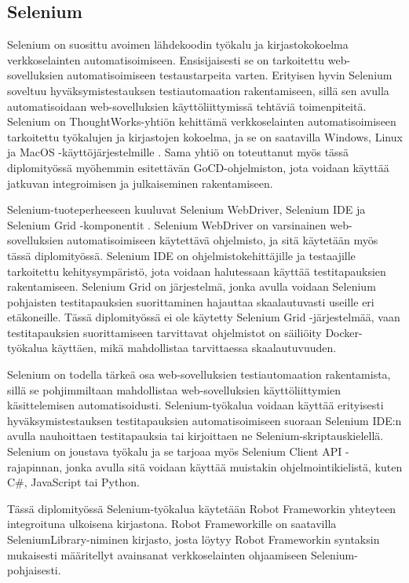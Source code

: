   \subsection{Selenium} \label{ch:08_selenium}

    Selenium on suosittu avoimen lähdekoodin työkalu ja kirjastokokoelma verkkoselainten automatisoimiseen.
    Ensisijaisesti se on tarkoitettu web-sovelluksien automatisoimiseen testaustarpeita varten. \cite[s.~1 ]{selenium_book}
    Erityisen hyvin Selenium soveltuu hyväksymistestauksen testiautomaation rakentamiseen, sillä sen avulla automatisoidaan web-sovelluksien käyttöliittymissä tehtäviä toimenpiteitä.
    Selenium on ThoughtWorks-yhtiön kehittämä verkkoselainten automatisoimiseen tarkoitettu työkalujen ja kirjastojen kokoelma, ja se on saatavilla Windows, Linux ja MacOS -käyttöjärjestelmille \cite{selenium_info_1}.
    Sama yhtiö on toteuttanut myös tässä diplomityössä myöhemmin esitettävän GoCD-ohjelmiston, jota voidaan käyttää jatkuvan integroimisen ja julkaiseminen rakentamiseen.

    Selenium-tuoteperheeseen kuuluvat Selenium WebDriver, Selenium IDE ja Selenium Grid -komponentit \cite{selenium_info_2}.
    Selenium WebDriver on varsinainen web-sovelluksien automatisoimiseen käytettävä ohjelmisto, ja sitä käytetään myös tässä diplomityössä.
    Selenium IDE on ohjelmistokehittäjille ja testaajille tarkoitettu kehitysympäristö, jota voidaan halutessaan käyttää testitapauksien rakentamiseen.
    Selenium Grid on järjestelmä, jonka avulla voidaan Selenium pohjaisten testitapauksien suorittaminen hajauttaa skaalautuvasti useille eri etäkoneille.
    Tässä diplomityössä ei ole käytetty Selenium Grid -järjestelmää, vaan testitapauksien suorittamiseen tarvittavat ohjelmistot on säiliöity Docker-työkalua käyttäen, mikä mahdollistaa tarvittaessa skaalautuvuuden.

    Selenium on todella tärkeä osa web-sovelluksien testiautomaation rakentamista, sillä se pohjimmiltaan mahdollistaa web-sovelluksien käyttöliittymien käsittelemisen automatisoidusti.
    Selenium-työkalua voidaan käyttää erityisesti hyväksymistestauksen testitapauksien automatisoimiseen suoraan Selenium IDE:n avulla nauhoittaen testitapauksia tai kirjoittaen ne Selenium-skriptauskielellä.
    Selenium on joustava työkalu ja se tarjoaa myös Selenium Client API -rajapinnan, jonka avulla sitä voidaan käyttää muistakin ohjelmointikielistä, kuten C\#, JavaScript tai Python.

    Tässä diplomityössä Selenium-työkalua käytetään Robot Frameworkin yhteyteen integroituna ulkoisena kirjastona.
    Robot Frameworkille on saatavilla SeleniumLibrary-niminen kirjasto, josta löytyy Robot Frameworkin syntaksin mukaisesti määritellyt avainsanat verkkoselainten ohjaamiseen Selenium-pohjaisesti.

